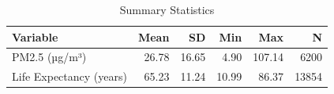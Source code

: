 \begin{table}[ht]
\centering
\caption{Summary Statistics} 
\label{tab:summary}
\begin{tabular}{lrrrrr}
  \hline
Variable & Mean & SD & Min & Max & N \\ 
  \hline
PM2.5 (µg/m³) & 26.78 & 16.65 & 4.90 & 107.14 & 6200 \\ 
  Life Expectancy (years) & 65.23 & 11.24 & 10.99 & 86.37 & 13854 \\ 
   \hline
\end{tabular}
\end{table}
